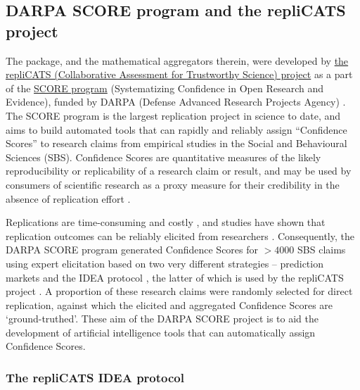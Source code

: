 \documentclass[article]{jss}
\begin{document}
\hypertarget{sec-repliCATS}{%
\subsection{DARPA SCORE program and the repliCATS
project}\label{sec-repliCATS}}

The  package, and the mathematical aggregators therein,
were developed by \href{https://replicats.research.unimelb.edu.au/}{the
repliCATS (Collaborative Assessment for Trustworthy Science) project} as
a part of the
\href{https://www.darpa.mil/program/systematizing-confidence-in-open-research-and-evidence}{SCORE
program} (Systematizing Confidence in Open Research and Evidence),
funded by DARPA (Defense Advanced Research Projects Agency)
\citep{alipourfard2021}. The SCORE program is the largest replication
project in science to date, and aims to build automated tools that can
rapidly and reliably assign ``Confidence Scores'' to research claims
from empirical studies in the Social and Behavioural Sciences (SBS).
Confidence Scores are quantitative measures of the likely
reproducibility or replicability of a research claim or result, and may
be used by consumers of scientific research as a proxy measure for their
credibility in the absence of replication effort
\citep{alipourfard2021}.

Replications are time-consuming and costly \citep{Isager2020}, and
studies have shown that replication outcomes can be reliably elicited
from researchers \citep{Gordon2020}. Consequently, the DARPA SCORE
program generated Confidence Scores for \(> 4000\) SBS claims using
expert elicitation based on two very different strategies -- prediction
markets \citep{Gordon2020} and the IDEA protocol \citep{hemming2017},
the latter of which is used by the repliCATS project
\citep{Fraser:2021}. A proportion of these research claims were randomly
selected for direct replication, against which the elicited and
aggregated Confidence Scores are `ground-truthed'. These aim of the
DARPA SCORE project is to aid the development of artificial intelligence
tools that can automatically assign Confidence Scores.

\hypertarget{sec-IDEAprotocol}{%
\subsubsection{The repliCATS IDEA protocol}\label{sec-IDEAprotocol}}
\end{document}

